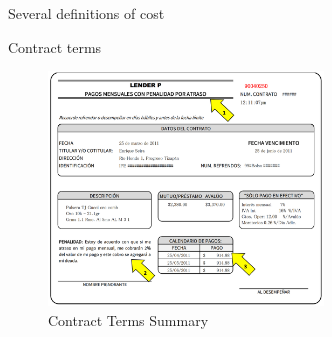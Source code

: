 \documentclass[8pt]{beamer}
\begin{document}
\begin{frame}{Several definitions of cost}

\begin{table}[H]
\caption{Effects on several definitions of cost}
\label{table_robustness_fc}
\begin{center}
\resizebox{0.95\textwidth}{!}{
\scriptsize{}
}
\end{center}
 \scriptsize 
 
\end{table}
    
\end{frame}


\begin{frame}{Contract terms}

\begin{figure}[H]
     \caption{Contract Terms Summary}
    \label{PaperSlip}
    \begin{center}
        \includegraphics[width=0.65\textwidth]{Figuras/TicketLenderP.png}

    \end{center}

\end{figure}





\end{frame}
\end{document}
